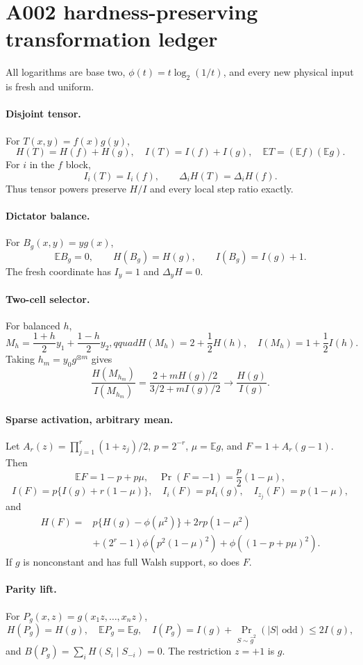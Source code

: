 \section*{A002 hardness-preserving transformation ledger}
All logarithms are base two, $\phi(t)=t\log_2(1/t)$, and every new physical
input is fresh and uniform.

\paragraph{Disjoint tensor.}
For $T(x,y)=f(x)g(y)$,
\[
 H(T)=H(f)+H(g),\quad I(T)=I(f)+I(g),\quad \mathbb ET=(\mathbb Ef)(\mathbb Eg).
\]
For $i$ in the $f$ block,
\[
 I_i(T)=I_i(f),\qquad \Delta_iH(T)=\Delta_iH(f).
\]
Thus tensor powers preserve $H/I$ and every local step ratio exactly.

\paragraph{Dictator balance.}
For $B_g(x,y)=yg(x)$,
\[
 \mathbb EB_g=0,\qquad H(B_g)=H(g),\qquad I(B_g)=I(g)+1.
\]
The fresh coordinate has $I_y=1$ and $\Delta_yH=0$.

\paragraph{Two-cell selector.}
For balanced $h$,
\[
 M_h=\frac{1+h}{2}y_1+\frac{1-h}{2}y_2,qquad
 H(M_h)=2+\frac12H(h),\quad I(M_h)=1+\frac12I(h).
\]
Taking $h_m=y_0g^{\otimes m}$ gives
\[
 \frac{H(M_{h_m})}{I(M_{h_m})}
 =\frac{2+mH(g)/2}{3/2+mI(g)/2}\to\frac{H(g)}{I(g)}.
\]

\paragraph{Sparse activation, arbitrary mean.}
Let $A_r(z)=\prod_{j=1}^r(1+z_j)/2$, $p=2^{-r}$, $\mu=\mathbb Eg$, and
$F=1+A_r(g-1)$. Then
\[
 \mathbb EF=1-p+p\mu,\quad \Pr(F=-1)=\frac p2(1-\mu),
\]
\[
 I(F)=p\{I(g)+r(1-\mu)\},\quad I_i(F)=pI_i(g),\quad I_{z_j}(F)=p(1-\mu),
\]
and
\[
\begin{aligned}
H(F)={}&p\{H(g)-\phi(\mu^2)\}+2rp(1-\mu^2)\\
&+(2^r-1)\phi(p^2(1-\mu)^2)+\phi((1-p+p\mu)^2).
\end{aligned}
\]
If $g$ is nonconstant and has full Walsh support, so does $F$.

\paragraph{Parity lift.}
For $P_g(x,z)=g(x_1z,\ldots,x_nz)$,
\[
 H(P_g)=H(g),\quad \mathbb EP_g=\mathbb Eg,
\quad I(P_g)=I(g)+\Pr_{S\sim\widehat g^2}(|S|\text{ odd})\le2I(g),
\]
and $B(P_g)=\sum_iH(S_i\mid S_{-i})=0$. The restriction $z=+1$ is $g$.

